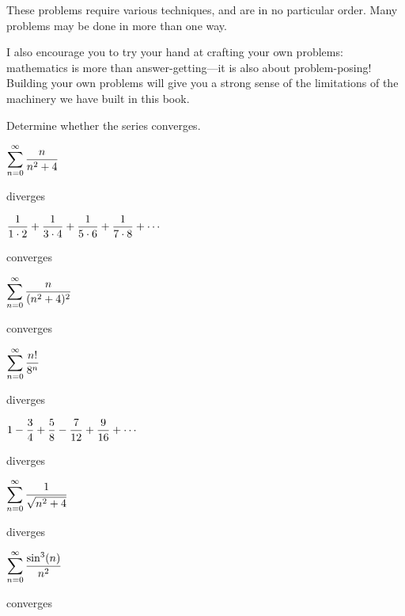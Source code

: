 These problems require various techniques, and are in no particular
order. Many problems may be done in more than one way.

I also encourage you to try your hand at crafting your own problems:
mathematics is more than answer-getting---it is also about
problem-posing!  Building your own problems will give you a strong
sense of the limitations of the machinery we have built in this book.

\begin{exercises}

Determine whether the series converges.

\begin{exercise} $\displaystyle\sum_{n=0}^\infty {n\over n^2+4}$
\begin{answer} diverges
\end{answer}\end{exercise}

\begin{exercise} $\displaystyle {1\over 1\cdot 2}+{1\over 3\cdot
  4}+{1\over 5\cdot 6}+{1\over 7\cdot 8}+\cdots$
\begin{answer} converges
\end{answer}\end{exercise}

\begin{exercise} $\displaystyle\sum_{n=0}^\infty {n\over (n^2+4)^2}$
\begin{answer} converges
\end{answer}\end{exercise}

\begin{exercise} $\displaystyle\sum_{n=0}^\infty {n!\over 8^n}$
\begin{answer} diverges
\end{answer}\end{exercise}

\begin{exercise} $\displaystyle 1-{3\over4}+{5\over8}-{7\over12}+{9\over16}+\cdots$
\begin{answer} diverges
\end{answer}\end{exercise}

\begin{exercise} $\displaystyle\sum_{n=0}^\infty {1\over \sqrt{n^2+4}}$
\begin{answer} diverges
\end{answer}\end{exercise}

\begin{exercise} $\displaystyle\sum_{n=0}^\infty {\sin^3(n)\over n^2}$
\begin{answer} converges
\end{answer}\end{exercise}


\end{exercises}
